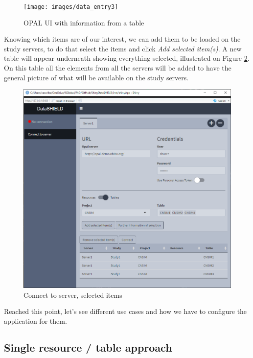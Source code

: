 \documentclass[
]{book}
\begin{document}
\begin{figure}

{\centering \texttt{[image: images/data\_entry3]} 

}

\caption{OPAL UI with information from a table}\label{fig:dataentry3}
\end{figure}

Knowing which items are of our interest, we can add them to be loaded on the study servers, to do that select the items and click \emph{Add selected item(s)}. A new table will appear underneath showing everything selected, illustrated on Figure \ref{fig:dataentry4}. On this table all the elements from all the servers will be added to have the general picture of what will be available on the study servers.

\begin{figure}

{\centering \includegraphics[width=12.68in]{images/data_entry4} 

}

\caption{Connect to server, selected items}\label{fig:dataentry4}
\end{figure}

Reached this point, let's see different use cases and how we have to configure the application for them.

\hypertarget{single-resource-table-approach}{%
\subsection{Single resource / table approach}\label{single-resource-table-approach}}
\end{document}

